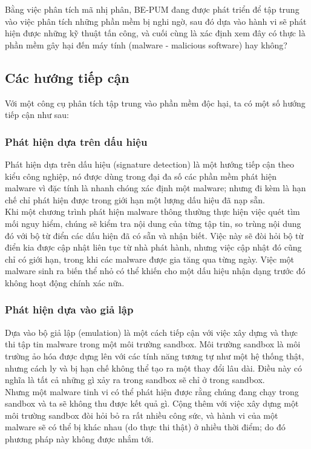Bằng việc phân tích mã nhị phân, BE-PUM đang được phát triển để tập trung vào việc phân tích những phần mềm bị nghi ngờ, sau đó dựa vào hành vi sẽ phát hiện được những kỹ thuật tấn công, và cuối cùng là xác định xem đây có thực là phần mềm gây hại đến máy tính (malware - malicious software) hay không?

	\subsection{Các hướng tiếp cận}

Với một công cụ phân tích tập trung vào phần mềm độc hại, ta có một số hướng tiếp cận như sau:
		\subsubsection{Phát hiện dựa trên dấu hiệu}
Phát hiện dựa trên dấu hiệu (signature detection) là một hướng tiếp cận theo kiểu công nghiệp, nó được dùng trong đại đa số các phần mềm phát hiện malware vì đặc tính là nhanh chóng xác định một malware; nhưng đi kèm là hạn chế chỉ phát hiện được trong giới hạn một lượng dấu hiệu đã nạp sẵn.\\

Khi một chương trình phát hiện malware thông thường thực hiện việc quét tìm mối nguy hiểm, chúng sẽ kiểm tra nội dung của từng tập tin, so trùng nội dung đó với bộ từ điển các dấu hiện đã có sẵn và nhận biết. Việc này sẽ đòi hỏi bộ từ điển kia được cập nhật liên tục từ nhà phát hành, nhưng việc cập nhật đó cũng chỉ có giới hạn, trong khi các malware được gia tăng qua từng ngày. Việc một malware sinh ra biến thể nhỏ có thể khiến cho một dấu hiệu nhận dạng trước đó không hoạt động chính xác nữa.

		\subsubsection{Phát hiện dựa vào giả lập}
Dựa vào bộ giả lập (emulation) là một cách tiếp cận với việc xây dựng và thực thi tập tin malware trong một môi trường sandbox. Môi trường sandbox là môi trường ảo hóa được dựng lên với các tính năng tương tự như một hệ thống thật, nhưng cách ly và bị hạn chế không thể tạo ra một thay đổi lâu dài. Điều này có nghĩa là tất cả những gì xảy ra trong sandbox sẽ chỉ ở trong sandbox.\\

Nhưng một malware tinh vi có thể phát hiện được rằng chúng đang chạy trong sandbox và ta sẽ không thu được kết quả gì. Cộng thêm với việc xây dựng một môi trường sandbox đòi hỏi bỏ ra rất nhiều công sức, và hành vi của một malware sẽ có thể bị khác nhau (do thực thi thật) ở nhiều thời điểm; do đó phương pháp này không được nhắm tới.

